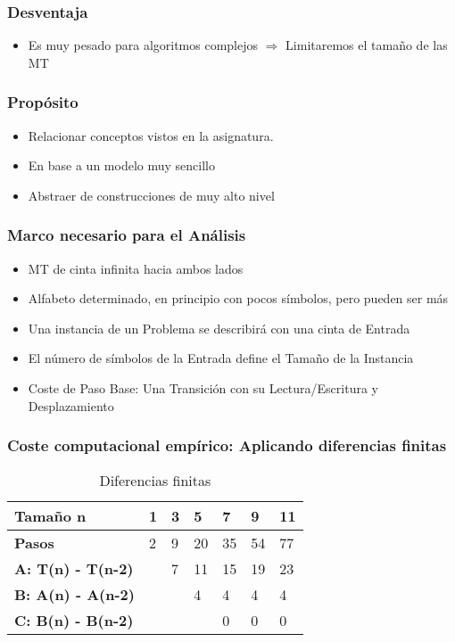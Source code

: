\subsubsection{Desventaja}
\begin{itemize}
    \item Es muy pesado para algoritmos complejos $\Rightarrow$ Limitaremos el tamaño de las MT
\end{itemize}

\subsubsection{Propósito}
\begin{itemize}
    \item Relacionar conceptos vistos en la asignatura.
    \item En base a un modelo muy sencillo
    \item Abstraer de construcciones de muy alto nivel
\end{itemize}

\subsubsection{Marco necesario para el Análisis}
\begin{itemize}
    \item MT de cinta infinita hacia ambos lados
    \item Alfabeto determinado, en principio con pocos símbolos, pero pueden ser más
    \item Una instancia de un Problema se describirá con una cinta de Entrada
    \item El número de símbolos de la Entrada define el Tamaño de la Instancia
    \item Coste de Paso Base: Una Transición con su Lectura/Escritura y Desplazamiento
\end{itemize}

\subsubsection{Coste computacional empírico: Aplicando diferencias finitas}
\begin{table}[H]
    \begin{tabular}{|l|l|l|l|l|l|l|}
    \hline
    Tamaño n                  & \textbf{1} & \textbf{3} & \textbf{5} & \textbf{7} & \textbf{9} & \textbf{11} \\ \hline
    \textbf{Pasos}            & 2          & 9          & 20         & 35         & 54         & 77          \\ \hline
    \textbf{A: T(n) - T(n-2)} &            & 7          & 11         & 15         & 19         & 23          \\ \hline
    \textbf{B: A(n) - A(n-2)} &            &            & 4          & 4          & 4          & 4           \\ \hline
    \textbf{C: B(n) - B(n-2)} &            &            &            & 0          & 0          & 0           \\ \hline
    \end{tabular}
    \caption{Diferencias finitas}
\end{table}

